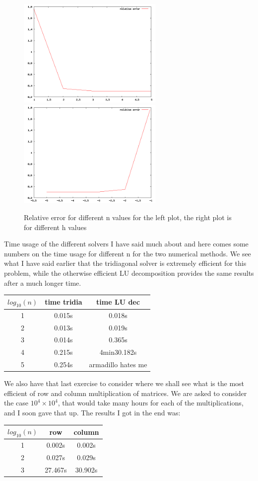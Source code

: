 \documentclass[12pt,a4wide]{article}
\begin{document}
\begin{figure}
	\includegraphics[width=7cm]{relativeerror}
	\includegraphics[width=7cm]{relativeerror1}
	\caption{Relative error for different n values for the left plot, the right plot is for different h values}
	\label{error}
\end{figure}


Time usage of the different solvers I have said much about and here comes some numbers on the time usage for different n for the two numerical methods.
We see what I have said earlier that the tridiagonal solver is extremely efficient for this problem, while the otherwise efficient LU decomposition 
provides the same results after a much longer time. 
\begin{tabular}{|c|c|c|}
	\hline
	${log_{10}}({n})$ & time tridia & time LU dec \\ \hline
	1 & 0.015s & 0.018s \\ \hline
	2 & 0.013s & 0.019s \\ \hline
	3 & 0.014s & 0.365s \\ \hline
	4 & 0.215s & 4min30.182s \\ \hline
	5 & 0.254s & armadillo hates me \\ \hline
	\hline
\end{tabular}
We also have that last exercise to consider where we shall see what is the most efficient of row and column multiplication of matrices. 
We are asked to consider the case ${10^4}\times{10^4}$, that would take many hours for each of the multiplications, and I soon gave that up.
The results I got in the end was:
\begin{tabular}{|c|c|c|}
	\hline
	${log_{10}}({n})$ & row & column \\ \hline
	1 & 0.002s & 0.002s \\ \hline
	2 & 0.027s & 0.029s \\ \hline
	3 & 27.467s & 30.902s \\ \hline
	\hline
\end{tabular}
	
\end{document}
